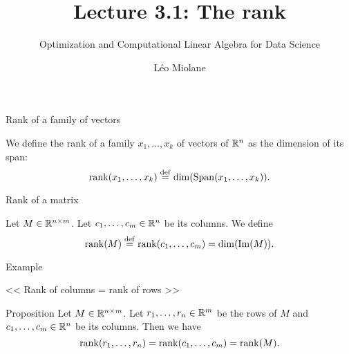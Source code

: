 \documentclass{beamer}
\title{Lecture 3.1: The rank}
\subtitle{Optimization and Computational Linear Algebra for Data Science}
\author{Léo Miolane}
\date{}
\begin{document}
\setcounter{showProgressBar}{0}
\setcounter{showSlideNumbers}{0}

\frame{\titlepage}


\setcounter{framenumber}{0}
\setcounter{showSlideNumbers}{1}


\begin{frame}[t]{Rank of a family of vectors}
	\begin{definition}
		We define the rank of a family $x_1, \dots, x_k$ of vectors of $\mathbb{R}^n$ as the dimension of its span:
		$$
		{{\rm rank}}(x_1, \dots, x_k) \overset{\rm def}{=} {{\rm dim}} ({{\rm Span}}(x_1, \dots, x_k)).
		$$
	\end{definition}
\end{frame}

\begin{frame}[t]{Rank of a matrix}
	\begin{definition}
		Let $M \in \mathbb{R}^{n \times m}$. Let $c_1, \dots, c_m \in \mathbb{R}^n$ be its columns.
		We define
		$$
		{{\rm rank}}(M) \overset{\rm def}{=} {{\rm rank}}(c_1, \dots, c_m) = {{\rm dim}}({{\rm Im}}(M)).
		$$
	\end{definition}
\end{frame}

\begin{frame}{Example}
\end{frame}

\begin{frame}[t]{<< Rank of columns = rank of rows >>}
	\begin{block}{Proposition}
		Let $M \in \mathbb{R}^{n \times m}$. Let $r_1, \dots, r_n \in \mathbb{R}^m$ be the rows of $M$ and $c_1, \dots, c_m \in \mathbb{R}^n$ be its columns.
		Then we have
		$$
		{{\rm rank}}(r_1, \dots, r_n) = {{\rm rank}}(c_1, \dots, c_m) = {{\rm rank}}(M).
		$$
	\end{block}
\end{frame}
\end{document}
